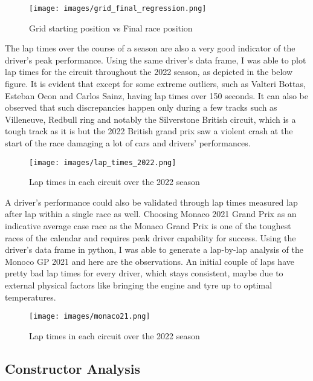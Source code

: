 \documentclass[10pt,twocolumn,letterpaper]{article}
\begin{document}
\begin{figure}[h]
\centering
\texttt{[image: images/grid\_final\_regression.png]} 
\caption{Grid starting position vs Final race position}
\end{figure}

The lap times over the course of a season are also a very good indicator of the driver's peak performance. Using the same driver's data frame, I was able to plot lap times for the circuit throughout the 2022 season, as depicted in the below figure. It is evident that except for some extreme outliers, such as Valteri Bottas, Esteban Ocon and Carlos Sainz, having lap times over 150 seconds. It can also be observed that such discrepancies happen only during a few tracks such as Villeneuve, Redbull ring and notably the Silverstone British circuit, which is a tough track as it is but the 2022 British grand prix saw a violent crash at the start of the race damaging a lot of cars and drivers' performances\cite{silverstone_crash_2022}.  \\

\begin{figure}[h]
\centering
\texttt{[image: images/lap\_times\_2022.png]} 
\caption{Lap times in each circuit over the 2022 season}
\end{figure}

A driver's performance could also be validated through lap times measured lap after lap within a single race as well. Choosing Monaco 2021 Grand Prix as an indicative average case race as the Monaco Grand Prix is one of the toughest races of the calendar and requires peak driver capability for success. Using the driver's data frame in python, I was able to generate a lap-by-lap analysis of the Monoco GP 2021 and here are the observations. An initial couple of laps have pretty bad lap times for every driver, which stays consistent, maybe due to external physical factors like bringing the engine and tyre up to optimal temperatures. \cite{tyre_temp} \cite{wright2001formula} 

\begin{figure}[h]
\centering
\texttt{[image: images/monaco21.png]} 
\caption{Lap times in each circuit over the 2022 season}
\end{figure}


\subsection{Constructor Analysis}
\end{document}
